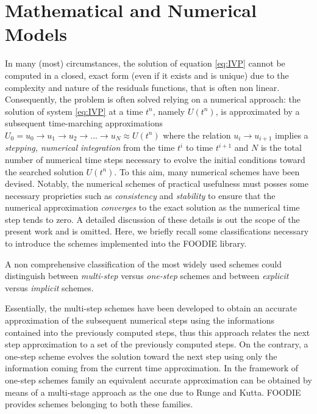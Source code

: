 \section{Mathematical and Numerical Models}\label{sec:MNmodels}

In many (most) circumstances, the solution of equation \ref{eq:IVP} cannot be computed in a closed, exact form (even if it exists and is unique) due to the complexity and nature of the residuals functions, that is often non linear. Consequently, the problem is often solved relying on a numerical approach: the solution of system \ref{eq:IVP} at a time $t^n$, namely $U(t^n)$, is approximated by a subsequent time-marching approximations $U_0=u_0 \rightarrow u_1 \rightarrow u_2 \rightarrow ... \rightarrow u_N\approx U(t^n)$ where the relation $u_i \rightarrow u_{i+1}$ implies a \emph{stepping, numerical integration} from the time $t^i$ to time $t^{i+1}$ and $N$ is the total number of numerical time steps necessary to evolve the initial conditions toward the searched solution $U(t^n)$. To this aim, many numerical schemes have been devised. Notably, the numerical schemes of practical usefulness must posses some necessary proprieties such as \emph{consistency} and \emph{stability} to ensure that the numerical approximation \emph{converges} to the exact solution as the numerical time step tends to zero. A detailed discussion of these details is out the scope of the present work and is omitted. Here, we briefly recall some classifications necessary to introduce the schemes implemented into the FOODIE library.

A non comprehensive classification of the most widely used schemes could distinguish between \emph{multi-step} versus \emph{one-step} schemes and between \emph{explicit} versus \emph{implicit} schemes.

Essentially, the multi-step schemes have been developed to obtain an accurate approximation of the subsequent numerical steps using the informations contained into the previously computed steps, thus this approach relates the next step approximation to a set of the previously computed steps. On the contrary, a one-step scheme evolves the solution toward the next step using only the information coming from the current time approximation. In the framework of one-step schemes family an equivalent accurate approximation can be obtained by means of a multi-stage approach as the one due to Runge and Kutta. FOODIE provides schemes belonging to both these families.

